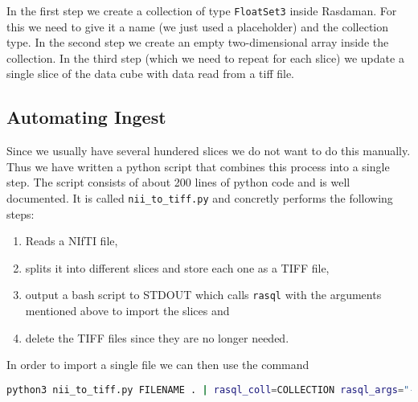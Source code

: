 In the first step we create a collection of type \lstinline{FloatSet3} inside Rasdaman. For this we need to give it a name (we just used a placeholder) and the collection type. 
In the second step we create an empty two-dimensional array inside the collection. 
In the third step (which we need to repeat for each slice) we update a single slice of the data cube with data read from a tiff file. 

\subsection{Automating Ingest}

Since we usually have several hundered slices we do not want to do this manually. Thus we have written a python script that combines this process into a single step. The script consists of about 200 lines of python code and is well documented. It is called \lstinline{nii_to_tiff.py} and concretly performs the following steps: 

\begin{enumerate}
  \item Reads a NIfTI file, 
  \item splits it into different slices and store each one as a TIFF file, 
  \item output a bash script to STDOUT which calls \lstinline{rasql} with the arguments mentioned above to import the slices and 
  \item delete the TIFF files since they are no longer needed. 
\end{enumerate}

In order to import a single file we can then use the command
\begin{lstlisting}[showstringspaces=false,morekeywords={NAME},language=Bash]
python3 nii_to_tiff.py FILENAME . | rasql_coll=COLLECTION rasql_args="--quiet" bash
\end{lstlisting}